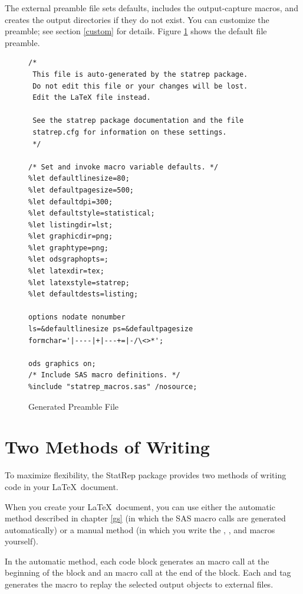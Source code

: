\documentclass[article,oneside]{memoir}
\newcommand*{\StatRep}{\textsf{StatRep}\xspace}
\begin{document}
  The external preamble file sets defaults, includes
  the output-capture macros, and creates the output directories if they do not exist.
  You can customize the preamble; see section \ref{custom} for details.
  Figure \ref{fig:preamble} shows the default file preamble.
\begin{figure}[H]
\begin{snugshade}
\begin{verbatim}
/*
 This file is auto-generated by the statrep package.
 Do not edit this file or your changes will be lost.
 Edit the LaTeX file instead.

 See the statrep package documentation and the file
 statrep.cfg for information on these settings.
 */

/* Set and invoke macro variable defaults. */
%let defaultlinesize=80;
%let defaultpagesize=500;
%let defaultdpi=300;
%let defaultstyle=statistical;
%let listingdir=lst;
%let graphicdir=png;
%let graphtype=png;
%let odsgraphopts=;
%let latexdir=tex;
%let latexstyle=statrep;
%let defaultdests=listing;

options nodate nonumber
ls=&defaultlinesize ps=&defaultpagesize
formchar='|----|+|---+=|-/\<>*';

ods graphics on;
/* Include SAS macro definitions. */
%include "statrep_macros.sas" /nosource;

\end{verbatim}
\end{snugshade}
\caption{Generated Preamble File}\label{fig:preamble}
\end{figure}

\chapter{Two Methods of Writing}
  To maximize flexibility, the \StatRep package provides two methods of writing code in your
\LaTeX\ document.

When you create your \LaTeX\ document, you can use either the automatic method described in
chapter \ref{gs} (in which the SAS macro calls are generated automatically) or a manual
method (in which you write the , , and  macros yourself).

In the automatic method, each  code block generates an  macro call at the beginning
of the block and an  macro call at the end of the block.
Each  and  tag generates the 
macro to replay the selected output objects to external files.
\end{document}
